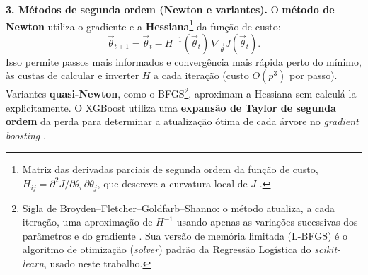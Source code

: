 \documentclass[msc]{on} %
\providecommand{\DIFaddtex}[1]{{\protect\color{red}#1}} %
\providecommand{\DIFaddbegin}{} %
\providecommand{\DIFaddend}{} %
\providecommand{\DIFadd}[1]{\texorpdfstring{\DIFaddtex{#1}}{#1}} %
\begin{document}
\textbf{3. Métodos de segunda ordem (Newton e variantes).} O \textbf{método de Newton} utiliza o gradiente e a \textbf{Hessiana}\footnote{Matriz das derivadas parciais de segunda ordem da função de custo, $H_{ij} = \partial^2 J / \partial\theta_i\,\partial\theta_j$, que descreve a curvatura local de $J$ \citep{Nocedal2006}.} da função de custo:
\[
\vec{\theta}_{t+1} = \vec{\theta}_t - H^{-1}(\vec{\theta}_t) \, \nabla_{\vec{\theta}} J(\vec{\theta}_t).
\]
Isso permite passos mais informados e convergência mais rápida perto do mínimo, às custas de calcular e inverter \(H\) a cada iteração (custo \(O(p^3)\) por passo). Variantes \textbf{quasi-Newton}, como o BFGS\footnote{Sigla de Broyden--Fletcher--Goldfarb--Shanno: o método atualiza, a cada iteração, uma aproximação de $H^{-1}$ usando apenas as variações sucessivas dos parâmetros e do gradiente \citep[cap.~6]{Nocedal2006}. \DIFaddbegin \DIFadd{Sua versão de memória limitada (L-BFGS) é o algoritmo de otimização (}\textit{\DIFadd{solver}}\DIFadd{) padrão da Regressão Logística do }\textit{\DIFadd{scikit-learn}}\DIFadd{, usado neste trabalho.}\DIFaddend }, aproximam a Hessiana sem calculá-la explicitamente. O XGBoost utiliza uma \textbf{expansão de Taylor de segunda ordem} da perda para determinar a atualização ótima de cada árvore no \textit{gradient boosting} \citep{geron2019maos}.
\end{document}
